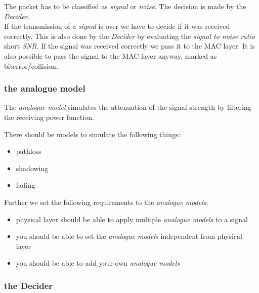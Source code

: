The packet has to be classified as \textit{signal} or
\textit{noise}. The decision is made by the
\textit{Decider}.\\

If the transmission of a \textit{signal} is over we have to decide if it was
received correctly. This is also done by the
\textit{Decider} by evaluating the \textit{signal to noise ratio} short
\textit{SNR}. 
If the signal was received correctly we pass it to the MAC
layer. It is also possible to pass the signal to
the MAC layer anyway, marked as biterror/collision.

\subsubsection{the analogue model}
\label{analogueModel}

The \textit{analogue model} simulates the attenuation of the signal strength by
filtering the receiving power function.

There should be models to simulate the following things:

\begin{itemize}
 \item pathloss
 \item shadowing
 \item fading
\end{itemize}

Further we set the following requirements to the \textit{analogue models}:

\begin{itemize}
 \item physical layer should be able to apply multiple \textit{analogue models}
to a signal
 \item you should be able to set the \textit{analogue models} independent from
physical layer
 \item you should be able to add your own \textit{analogue
models}
\end{itemize}

\subsubsection{the Decider}
\label{Decider}

